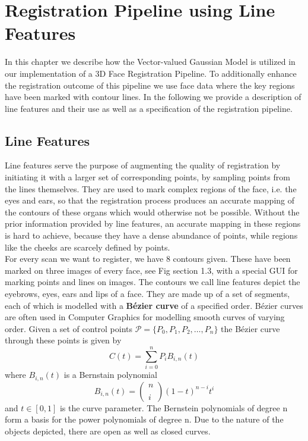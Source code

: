 \chapter{Registration Pipeline using Line Features}
In this chapter we describe how the Vector-valued Gaussian Model is utilized in our implementation of a 3D Face Registration Pipeline. To additionally enhance the registration outcome of this pipeline we use face data where the key regions have been marked with contour lines. In the following we provide a description of line features and their use as well as a specification of the registration pipeline. 

\section{Line Features}
Line features serve the purpose of augmenting the quality of registration by initiating it with a larger set of corresponding points, by sampling points from the lines themselves. They are used to mark complex regions of the face, i.e. the eyes and ears, so that the registration process produces an accurate mapping of the contours of these organs which would otherwise not be possible. Without the prior information provided by line features, an accurate mapping in these
regions is hard to achieve, because they have a dense abundance of points, while regions like the cheeks are scarcely defined by points.\\

For every scan we want to register, we have 8 contours given. These have been marked on three images of every face, see Fig section 1.3, with a special GUI for marking points and lines on images. The contours we call line features depict the eyebrows, eyes, ears and lips of a face. They are made up of a set of segments, each of which is modelled with a \textbf{B\'{e}zier curve} of a specified order. B\'{e}zier curves are often used in Computer
Graphics for modelling smooth curves of varying order. Given a set of control points $\mathcal{P} = \{P_{0}, P_{1}, P_{2}, \ldots, P_{n}\}$ the B\'{e}zier curve through these points is given by
\begin{equation}
    C(t)=\sum_{i=0}^{n}P_{i}B_{i,n}(t)
\end{equation}
where $B_{i,n}(t)$ is a Bernstain polynomial 
\begin{equation}
    B_{i,n}(t)=\begin{pmatrix} n \\ \\ i \end{pmatrix}(1-t)^{n-i}t^i
\end{equation}
and $t \in [0,1]$ is the curve parameter. The Bernstein polynomials of degree n form a basis for the power polynomials of degree n. 
Due to the nature of the objects depicted, there are open as well as closed curves. 

